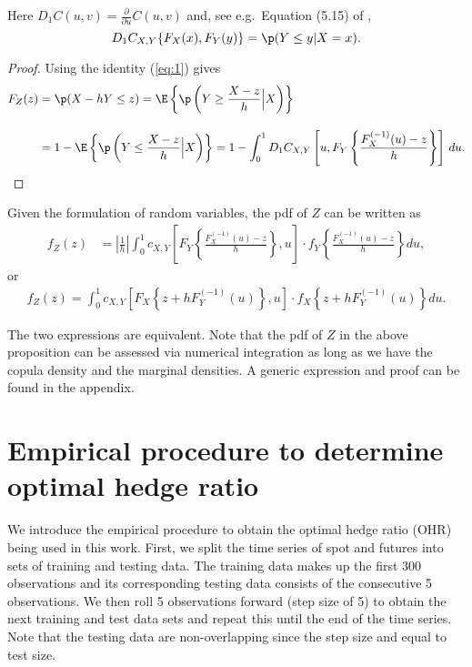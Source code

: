 Here $D_1 C(u,v)=\displaystyle \frac{\partial}{\partial u} C(u,v)$ and, see e.g.\ Equation (5.15) of
\citep{McNeil2005},
\begin{equation}
  \label{eq:1}
  D_1 C_{X,Y}\{F_X(x), F_Y(y)\} = \p(Y\leq y|X=x).
\end{equation}
\begin{proof}
  Using the identity (\ref{eq:1}) gives
  \begin{align*}
    F_{Z}(z) &= \p(X - h Y\leq z) %
                 = \E\left\{\p\left(Y\geq \frac{X-z}{h}\Big|
                 X\right)\right\}\\[10pt]
               &= 1-\E\left\{\p\left(Y\leq \frac{X-z}{h}\Big|
                 X\right)\right\}%
               = 1- \int_0^1 D_1 C_{X, Y}\left[u,
                 F_{Y}\left\{\frac{F^{(-1)}_{X}(u) -
                 z}{h}\right\}\right]\, d u.
  \end{align*}
  \end{proof}


\begin{corollary} Given the formulation of random variables, the
  pdf of $Z$ can be written as 
  \begin{align}
  f_{Z}(z) &= \left|\frac{1}{h}\right|\int_0^1 c_{X, Y} \left[
  F_{Y}\left\{\frac{F^{(-1)}_{X}(u)-z}{h}\right\}, u
  \right]
   \cdot
  f_{Y}
  \left\{\frac{F^{(-1)}_{X}(u)-z}{h}\right\} du, \label{eq:density1}
  \end{align} or
    \begin{align}
      f_{Z}(z)
      = \int_0^1 c_{X, Y} \left[
      F_{X}\left\{z + h F^{(-1)}_{Y}(u)\right\}, u
      \right]
       \cdot
      f_{X}
      \left\{
      z+ hF^{(-1)}_{Y}(u)
      \right\} du. \label{eq:density2}
  \end{align}
  \end{corollary}
The two expressions are equivalent.
Note that the pdf of $Z$ in the above proposition can be assessed via numerical integration
as long as we have the copula density and the marginal
densities.
A generic expression and proof can be found in the
appendix.

\section{Empirical procedure to determine optimal hedge ratio}\label{sec:empirical-procedure}
We introduce the empirical procedure to obtain the optimal hedge ratio (OHR) being used in this work.
First, we split the time series of spot and futures into sets of
training and testing data.
The training data makes up the first 300
observations and its corresponding testing data consists of the
consecutive 5 observations.
We then roll 5 observations forward (step size of 5) to obtain the next training and
test data sets and repeat this until the end of the time series. 
Note that the testing data are non-overlapping since the step size and equal to test size. \medskip

